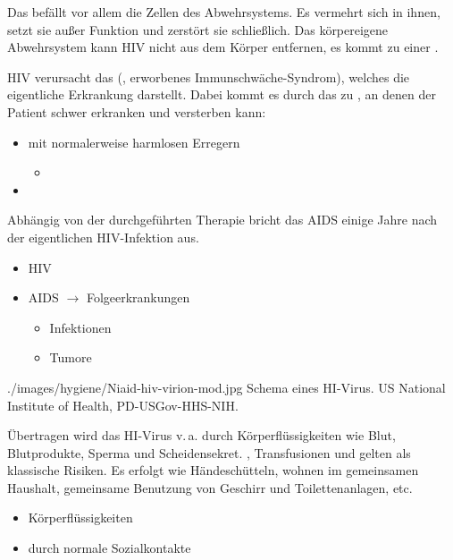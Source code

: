 \bigskip
{}
{%
Das  befällt vor allem die
Zellen des Abwehrsystems. Es vermehrt sich in ihnen, setzt sie
außer Funktion und zerstört sie schließlich. Das
körpereigene Abwehrsystem kann HIV nicht aus dem Körper
    entfernen, es kommt zu einer .

HIV verursacht das  (, erworbenes
Immunschwäche-Syndrom), welches die eigentliche Erkrankung
darstellt. Dabei kommt es durch das  zu , an denen der Patient
schwer erkranken und versterben kann:
\begin{itemize}
  \item {} mit normalerweise harmlosen
  Erregern
  \begin{itemize}
    \item {}
  \end{itemize}
  \item {}
\end{itemize}
Abhängig von der durchgeführten Therapie bricht das AIDS
einige Jahre nach der eigentlichen HIV-Infektion aus.
}{
\begin{itemize}
    \item HIV
    \item AIDS $\rightarrow$ Folgeerkrankungen
    \begin{itemize}
      \item Infektionen
      \item Tumore
    \end{itemize}
\end{itemize}
}
{./images/hygiene/Niaid-hiv-virion-mod.jpg}
{Schema eines HI-Virus.}
{US National Institute of Health, PD-USGov-HHS-NIH.}









{%
Übertragen wird das HI-Virus v.\,a. durch Körperflüssigkeiten
wie Blut, Blutprodukte, Sperma und Scheidensekret.
, Transfusionen und
 gelten als klassische Risiken.
Es erfolgt  wie Händeschütteln, wohnen im
gemeinsamen Haushalt, gemeinsame Benutzung von Geschirr und
Toilettenanlagen, etc.
}{
\begin{itemize}
  \item Körperflüssigkeiten
  \item {} durch normale Sozialkontakte
\end{itemize}
}
{}
{}
{}

